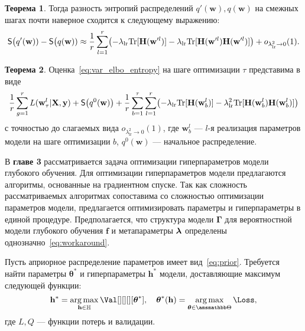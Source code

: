 \documentclass[11pt, a5paper]{dissert}
\theoremstyle{definition}
\newtheorem{theorem}{Теорема}
\DeclareMathOperator*{\argmax}{arg\,max}
\begin{document}
{\begin{theorem}
Тогда разность энтропий распределений $q'(\mathbf{w}), q(\mathbf{w})$ на смежных шагах почти наверное сходится к следующему выражению: 
\begin{equation}
\label{eq:entropy}
	\mathsf{S}\bigl(q'(\mathbf{w})) -  \mathsf{S}\bigl(q(\mathbf{w}))  \approx  \frac{1}{r}\sum_{l=1}^r \bigl(-\lambda_{\text{lr}} \textnormal{Tr}[\mathbf{H}(\mathbf{w}'^l)] - \lambda_{\text{lr}} \textnormal{Tr}[\mathbf{H}(\mathbf{w}'^l)\mathbf{H}(\mathbf{w}'^l)]  \bigr) + o_{\lambda_{\text{lr}}^2 \to 0}(1).
\end{equation}
\end{theorem}


\begin{theorem}\label{st:st2}
Оценка~\eqref{eq:var_elbo_entropy} на шаге оптимизации $\tau$ представима в виде
\begin{equation}
\label{eq:ev_grad_full}
 \frac{1}{r} \sum_{g = 1}^r L(\mathbf{w}^l_\tau| \mathbf{X}, \mathbf{y})  + \mathsf{S}\big(q^0(\mathbf{w})\bigr) + \frac{1}{r}\sum_{b=1}^\tau\sum_{l=1}^r \bigl(-\lambda_{\text{lr}} \textnormal{Tr}[\mathbf{H}(\mathbf{w}_b^l)] - \lambda_{\text{lr}}^2 \textnormal{Tr}[\mathbf{H}(\mathbf{w}_b^l)\mathbf{H}(\mathbf{w}_b^l)]  \bigr) 
\end{equation}
с точностью до слагаемых вида $o_{\lambda_{\text{lr}}^2 \to 0}(1)$,
где $\mathbf{w}_b^l$ --- $l$-я реализация параметров модели на шаге оптимизации $b$, $q^0(\mathbf{w})$ --- начальное распределение.
\end{theorem}

В \textbf{главе 3} рассматривается задача оптимизации гиперпараметров модели глубокого обучения. Для оптимизации гиперпараметров модели предлагаются алгоритмы, основанные на градиентном спуске. Так как сложность рассматриваемых алгоритмах сопоставима со сложностью оптимизации параметров модели, предлагается оптимизировать параметры и гиперпараметры в единой процедуре. Предполагается, что структура модели $\boldsymbol{\Gamma}$ для вероятностной модели глубокого обучения $\mathbf{f}$ и метапараметры $\boldsymbol{\lambda}$ определены однозначно~\eqref{eq:workaround}.

Пусть априорное распределение параметров имеет вид~\eqref{eq:prior}. Требуется найти параметры ${\boldsymbol{\theta}}^{*}$ и гиперпараметры $\mathbf{h}^{*}$ модели, доставляющие максимум следующей функции:
\begin{equation}
\label{eq:main}
    \mathbf{h}^{*} = \argmax_{\mathbf{h} \in \mathbb{H}} \Val[][][][{\teta}^{*}], \quad \boldsymbol{\theta}^{*}(\mathbf{h}) =  \argmax_{\boldsymbol{\theta} \in \Tetab} \Loss,
\end{equation}
где $L,Q$ --- функции потерь и валидации.

}
\end{document}
